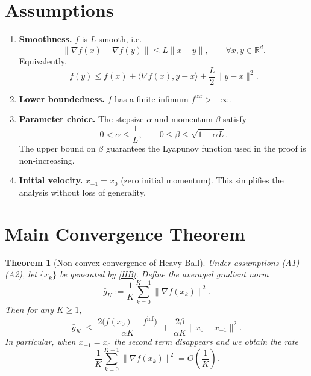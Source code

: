 \documentclass{article}
\newtheorem{theorem}{Theorem}
\newcommand{\R}{\mathbb{R}}
\begin{document}
\newpage
\section*{Assumptions}
\begin{enumerate}
\item \textbf{Smoothness.} $f$ is $L$‑smooth, i.e.
\[
\|\nabla f(x)-\nabla f(y)\|\le L\|x-y\|,\qquad\forall x,y\in\R^{d}.
\tag{A1}
\]
Equivalently,
\[
f(y)\le f(x)+\langle\nabla f(x),y-x\rangle+\frac{L}{2}\|y-x\|^{2}.
\tag{A1'}
\]

\item \textbf{Lower boundedness.} $f$ has a finite infimum $f^{\inf}>-\infty$.

\item \textbf{Parameter choice.} The stepsize $\alpha$ and momentum $\beta$ satisfy
\[
0<\alpha\le \frac{1}{L},\qquad 0\le\beta\le\sqrt{1-\alpha L}.
\tag{A2}
\]
The upper bound on $\beta$ guarantees the Lyapunov function used in the proof is non‑increasing.

\item \textbf{Initial velocity.} $x_{-1}=x_{0}$ (zero initial momentum). This simplifies the analysis without loss of generality.
\end{enumerate}

\section*{Main Convergence Theorem}
\begin{theorem}[Non‑convex convergence of Heavy‑Ball]\label{thm:hb}
Under assumptions (A1)–(A2), let $\{x_{k}\}$ be generated by \eqref{HB}. Define the averaged gradient norm
\[
\bar{g}_{K}:=\frac{1}{K}\sum_{k=0}^{K-1}\|\nabla f(x_{k})\|^{2}.
\]
Then for any $K\ge 1$,
\[
\bar{g}_{K}\;\le\;
\frac{2\bigl(f(x_{0})-f^{\inf}\bigr)}{\alpha K}
\;+\;
\frac{2\beta}{\alpha K}\|x_{0}-x_{-1}\|^{2}.
\tag{T1}
\]
In particular, when $x_{-1}=x_{0}$ the second term disappears and we obtain the rate
\[
\boxed{\displaystyle
\frac{1}{K}\sum_{k=0}^{K-1}\|\nabla f(x_{k})\|^{2}=O\!\left(\frac{1}{K}\right)}.
\]
\end{theorem}
\end{document}
